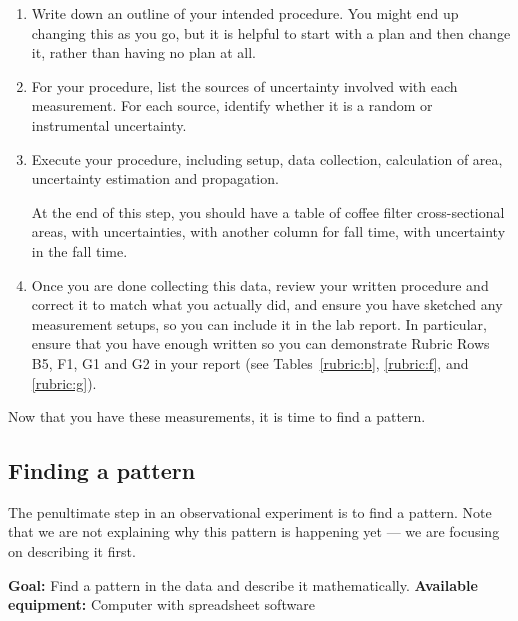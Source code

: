 \begin{enumerate}
	\item Write down an outline of your intended procedure. You might end up changing this as you go, but it is helpful to start with a plan and then change it, rather than having no plan at all.
	
	\item For your procedure, list the sources of uncertainty involved with each measurement. For each source, identify whether it is a random or instrumental uncertainty.
	
	\item Execute your procedure, including setup, data collection, calculation of area, uncertainty estimation and propagation.
	
	\begin{framed}
	At the end of this step, you should have a table of coffee filter cross-sectional areas, with uncertainties, with another column for fall time, with uncertainty in the fall time.
	\end{framed}
	
	\item Once you are done collecting this data, review your written procedure and correct it to match what you actually did, and ensure you have sketched any measurement setups, so you can include it in the lab report. In particular, ensure that you have enough written so you can demonstrate Rubric Rows B5, F1, G1 and G2 in your report (see Tables~\ref{rubric:b}, \ref{rubric:f}, and \ref{rubric:g}).
\end{enumerate}

Now that you have these measurements, it is time to find a pattern.

\subsection{Finding a pattern}

The penultimate step in an observational experiment is to find a pattern. Note that we are not explaining why this pattern is happening yet --- we are focusing on describing it first.

\textbf{Goal:} Find a pattern in the data and describe it mathematically.
\textbf{Available equipment:} Computer with spreadsheet software

